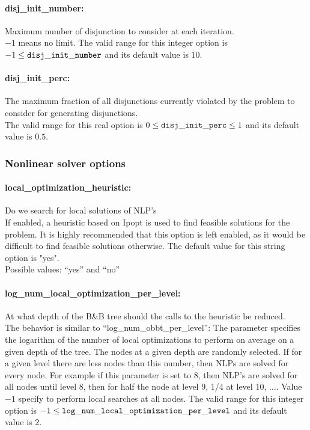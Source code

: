 \paragraph{disj\_init\_number:}\label{sec:disj_init_number} Maximum number of disjunction to consider at each iteration. $\;$ \\
$-1$ means no limit.
The valid range for this integer option is $-1 \le {\tt disj\_init\_number }$ and its default value is $10$.

\paragraph{disj\_init\_perc:}\label{sec:disj_init_perc} The maximum fraction of all disjunctions currently violated by the problem to consider for generating disjunctions. $\;$ \\
The valid range for this real option is 
$0 \le {\tt disj\_init\_perc } \le 1$
and its default value is $0.5$.

\subsubsection{Nonlinear solver options}

\paragraph{local\_optimization\_heuristic:}\label{sec:local_optimization_heuristic} Do we search for local solutions of NLP's $\;$ \\
If enabled, a heuristic based on Ipopt is used to find feasible solutions for the problem.
It is highly recommended that this option is left enabled, as it would be difficult to find feasible solutions otherwise.
The default value for this string option is "yes".\\
Possible values: ``yes'' and ``no''

\paragraph{log\_num\_local\_optimization\_per\_level:}\label{sec:log_num_local_optimization_per_level} At what depth of the B\&B tree should the calls to the heuristic be reduced. $\;$ \\
The behavior is similar to ``log\_num\_obbt\_per\_level'':
The parameter specifies the logarithm of the number of local optimizations to perform on average on a given depth of the tree.
The nodes at a given depth are randomly selected.
If for a given level there are less nodes than this number, then NLPs are solved for every node.
For example if this parameter is set to 8, then NLP's are solved for all nodes until level 8, then for half the node at
level 9, 1/4 at level 10, $\ldots$.
Value $-1$ specify to perform local searches at all nodes.
The valid range for this integer option is $-1 \le {\tt log\_num\_local\_optimization\_per\_level }$
and its default value is $2$.

